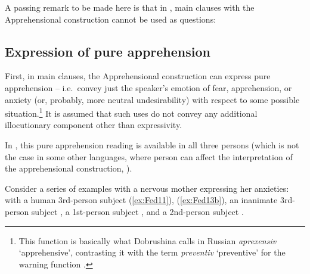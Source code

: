 \documentclass[output=paper,colorlinks,citecolor=brown]{langscibook}
\begin{document}
A passing remark to be made here is that in , main clauses with the Apprehensional construction cannot be used as questions:

\z

\subsection{Expression of pure apprehension}
\label{subsec:expression}

First, in main clauses, the Apprehensional construction can express pure apprehension -- i.e.\ convey just the speaker's emotion of fear, apprehension, or anxiety (or, probably, more neutral undesirability) with respect to some possible situation.\footnote{This function is basically what Dobrushina calls in Russian \textit{aprexensiv} `apprehensive', contrasting it with the term \textit{preventiv} `preventive' for the warning function \citep{Dobrushina2006}.} It is assumed that such uses do not convey any additional illocutionary component other than expressivity.

In , this pure apprehension reading is available in all three persons (which is not the case in some other languages, where person can affect the interpretation of the apprehensional construction, \citealt{chapters/vuillermet}).

Consider a series of examples with a nervous mother expressing her anxieties: with a human 3rd-person subject (\ref{ex:Fed11}), (\ref{ex:Fed13b}), an inanimate 3rd-person subject , a 1st-person subject , and a 2nd-person subject .


\z
\end{document}
